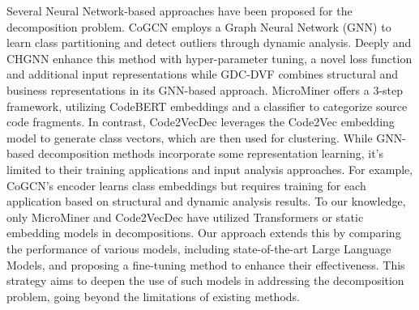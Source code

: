 Several Neural Network-based approaches have been proposed for the decomposition problem. CoGCN \cite{desai2021cogcn} employs a Graph Neural Network (GNN) to learn class partitioning and detect outliers through dynamic analysis. Deeply \cite{yedida2023deeply} and CHGNN \cite{mathai2022chgnn} enhance this method with hyper-parameter tuning, a novel loss function and additional input representations while GDC-DVF \cite{qian2023gdcdvf} combines structural and business representations in its GNN-based approach. MicroMiner \cite{trabelsi2023microminer} offers a 3-step framework, utilizing CodeBERT \cite{feng2020codebert} embeddings and a classifier to categorize source code fragments. In contrast, Code2VecDec \cite{aldebagy2021code2vec} leverages the Code2Vec \cite{alon2018code2vec} embedding model to generate class vectors, which are then used for clustering. While GNN-based decomposition methods incorporate some representation learning, it's limited to their training applications and input analysis approaches. For example, CoGCN's encoder learns class embeddings but requires training for each application based on structural and dynamic analysis results. To our knowledge, only MicroMiner and Code2VecDec have utilized Transformers or static embedding models in decompositions. Our approach extends this by comparing the performance of various models, including state-of-the-art Large Language Models, and proposing a fine-tuning method to enhance their effectiveness. This strategy aims to deepen the use of such models in addressing the decomposition problem, going beyond the limitations of existing methods.
